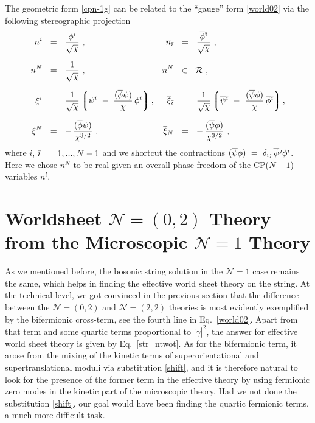 \documentclass[12pt]{article}
\newcommand{\ntwot}{${\mathcal N}= \left(2,2\right) $ }
\newcommand{\ntwoo}{${\mathcal N}= \left(0,2\right) $ }
\newcommand{\none}{${\mathcal N}=1$ }
\newcommand{\wt}{\widetilde}
\newcommand{\ov}{\overline}
\newcommand{\mc}[1]{\mathcal{#1}}
\newcommand{\lgr}{\left\lgroup}
\newcommand{\rgr}{\right\rgroup}
\newcommand{\tgamma}{\wt{\gamma}}
\begin{document}
	The geometric form \eqref{cpn-1g} can be related to the ``gauge'' form \eqref{world02}
	via the following stereographic projection
\begin{align*}
%
	n^i & ~~=~~ \frac{\phi^i}{\sqrt{\chi}}~,
	& 
	\ov{n}_\bi & ~~=~~ \frac{\ov{\phi}{}^\bi}{\sqrt{\chi}}~,
\\[2mm]
%
	n^N & ~~=~~ \frac{1}{\sqrt{\chi}}~,
	& n^N & ~~\in~~ \mc{R}~,
\\[2mm]
%
	\xi^i & ~~=~~ \frac{1}{\sqrt{\chi}} \lgr \psi^i ~-~ \frac{(\ov{\phi}\psi)}{\chi}\,\phi^i \rgr,
	& 
	\ov{\xi}{}_\bi & ~~=~~ \frac{1}{\sqrt{\chi}} 
					\lgr \ov{\psi}{}^\bi ~-~ \frac{(\ov{\psi}\phi)}{\chi}\, \ov{\phi}{}^\bi \rgr,
\\[2mm]
%
	\xi^N & ~~=~~ -\, \frac{(\ov{\phi} \psi)}{\chi^{3/2}}~,
	&
	\ov{\xi}{}_N & ~~=~~ -\, \frac{(\ov{\psi} \phi)}{\chi^{3/2}}~,
\end{align*}
	where $	i,\, {\bar \imath} ~=~ 1, ..., N-1 $ and we shortcut the contractions 
	$ (\ov{\psi} \phi) ~=~ \delta_{i\bj}\, \ov{\psi}{}^\bj \phi^i $.
	Here we chose $ n^N $ to be real given an overall phase freedom of the CP($N-1$) variables $ n^l $.


%
%
\section{Worldsheet \boldmath\ntwoo Theory from the Microscopic \boldmath\none Theory}
\label{WS}
\setcounter{equation}{0}

	As we mentioned before, the bosonic string solution in the \none case remains the same,
	which helps in finding the effective world sheet theory on the string. 
	At the technical level, we got convinced in the previous section that the difference
	between the \ntwoo and \ntwot theories is most evidently exemplified by the bifermionic cross-term,
	see the fourth line in Eq.~\eqref{world02}.
	Apart from that term and some quartic terms proportional to $|\tgamma|^2$, the answer for effective 
	world sheet theory is given by Eq.~\eqref{str_ntwot}.
	As for the bifermionic term, it arose from the mixing of the kinetic terms of 
	superorientational and supertranslational moduli via substitution \eqref{shift}, and it is therefore 
	natural to look for the presence of the former term in the effective theory by using fermionic zero modes 
	in the kinetic part of the microscopic theory. 
	Had we not done the substitution \eqref{shift}, our goal would have been finding the quartic fermionic terms,
	a much more difficult task. 
\end{document}
